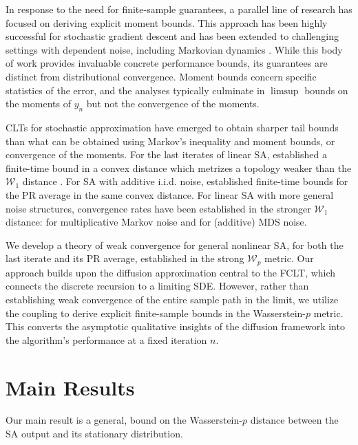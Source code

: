 \documentclass[11pt]{article}
\begin{document}
In response to the need for finite-sample guarantees, a parallel line of research has focused on deriving explicit moment bounds. 
This approach has been highly successful for stochastic gradient descent \citep{moulines_bach,bach2013non} and has been extended to challenging settings with dependent noise, including Markovian dynamics \citep{srikant19,chen2022finitesampleanalysisnonlinearstochastic,thinhMarkovGD}. 
While this body of work provides invaluable concrete performance bounds, its guarantees are distinct from distributional convergence.
Moment bounds concern specific statistics of the error, and the analyses typically culminate in $\limsup$ bounds on the moments of $y_n$ but not the convergence of the moments. 


\Nonasymptotic CLTs for stochastic approximation have emerged to obtain sharper tail bounds than what can be obtained using Markov's inequality and moment bounds, or convergence of the moments. 
For the last iterates of linear SA, \citet{butyrin2025gaussian} established a finite-time bound in a convex distance which metrizes a topology weaker than the $\mathcal{W}_1$ distance \citep{nourdin2021multivariatenormalapproximationwiener}.
For \nonlinear SA with additive i.i.d. noise, \citet{sheshukova2025gaussianapproximationmultiplierbootstrap} established finite-time bounds for the PR average in the same convex distance.
For linear SA with more general noise structures, convergence rates have been established in the stronger $\mathcal{W}_1$ distance: \citep{srikant2024CLT} for multiplicative Markov noise and \citep{kong2025nonasymptoticclterrorbounds} for (additive) MDS noise.


We develop a \nonasymptotic theory of weak convergence for general nonlinear SA, for both the last iterate and its PR average, established in the strong $\mathcal{W}_p$ metric.
Our approach builds upon the diffusion approximation central to the FCLT, which connects the discrete recursion to a limiting SDE. 
However, rather than establishing weak convergence of the entire sample path in the limit, we utilize the coupling to derive explicit finite-sample bounds in the Wasserstein-$p$ metric. 
This converts the asymptotic qualitative insights of the diffusion framework into the algorithm's performance at a fixed iteration $n$. 



\section{Main Results}\label{sec:results}
Our main result is a general, \nonasymptotic bound on the Wasserstein-$p$ distance between the SA output and its stationary distribution. 
\end{document}
